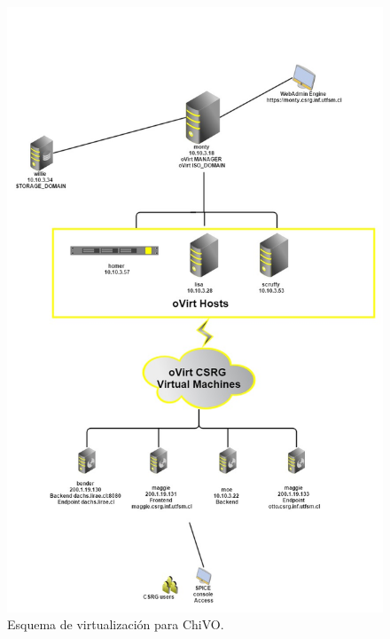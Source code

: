 \begin{figure}[ht!]
	\begin{center}
		\includegraphics[scale=.21]{img/ovirt}
	\end{center}
	\caption{Esquema de virtualización para ChiVO.}\label{img:ovirt}
\end{figure}
